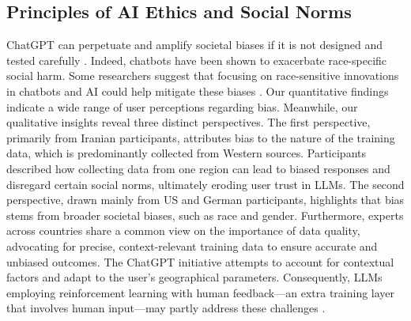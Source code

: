 \documentclass[sigconf]{acmart}
\begin{document}
\subsection{Principles of AI Ethics and Social Norms}

ChatGPT can perpetuate and amplify societal biases if it is not designed and tested carefully \cite{hermann2022leveraging}. Indeed, chatbots have been shown to exacerbate race-specific social harm. Some researchers suggest that focusing on race-sensitive innovations in chatbots and AI could help mitigate these biases \cite{schlesinger2018let}. Our quantitative findings indicate a wide range of user perceptions regarding bias. Meanwhile, our qualitative insights reveal three distinct perspectives. The first perspective, primarily from Iranian participants, attributes bias to the nature of the training data, which is predominantly collected from Western sources. Participants described how collecting data from one region can lead to biased responses and disregard certain social norms, ultimately eroding user trust in LLMs. The second perspective, drawn mainly from US and German participants, highlights that bias stems from broader societal biases, such as race and gender. Furthermore, experts across countries share a common view on the importance of data quality, advocating for precise, context-relevant training data to ensure accurate and unbiased outcomes. The ChatGPT initiative attempts to account for contextual factors and adapt to the user's geographical parameters. Consequently, LLMs employing reinforcement learning with human feedback—an extra training layer that involves human input—may partly address these challenges \cite{Abdullah2022ChatGPT}.
\end{document}
